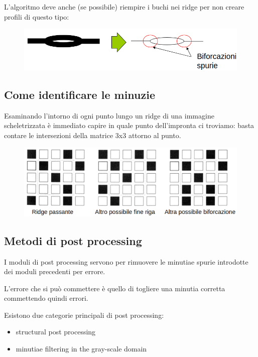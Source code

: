 \documentclass{report}
\begin{document}
\newpage
\noindent L’algoritmo deve anche (se possibile) riempire i
buchi nei ridge per non creare profili di questo
tipo:
\begin{figure}[ht]
    \centering
    \includegraphics[width=1\linewidth]{images/thinning-bif.png}
\end{figure}


\subsection{Come identificare le minuzie}

Esaminando l’intorno di ogni punto lungo un ridge
di una immagine scheletrizzata è immediato capire in 
quale punto dell'impronta ci troviamo: basta contare le intersezioni
della matrice 3x3 attorno al punto.

\begin{figure}[ht]
    \centering
    \includegraphics[width=1\linewidth]{images/identificazione-minuzie.png}
\end{figure}

\subsection{Metodi di post processing}

I moduli di post processing servono per rimuovere le
minutiae spurie introdotte dei moduli precedenti per errore.

\noindent L’errore che si può commettere è quello di togliere una
minutia corretta commettendo quindi errori.

\noindent Esistono due categorie principali di post processing:
\begin{itemize}
    \item structural post processing
    \item minutiae filtering in the gray-scale domain
\end{itemize}
\end{document}
